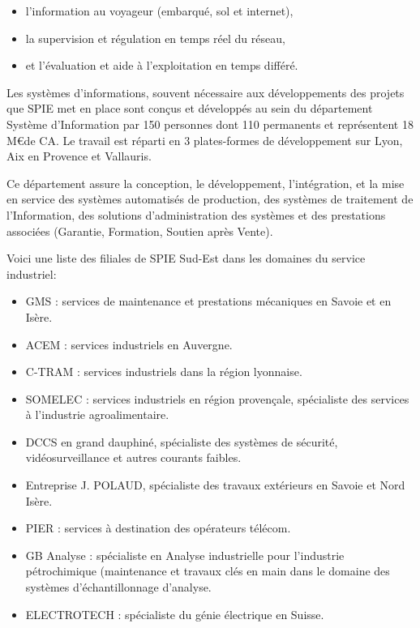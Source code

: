 \begin{itemize}
\item l’information au voyageur (embarqué, sol et internet),
\item la supervision et régulation en temps réel du réseau,
\item et l’évaluation et aide à l’exploitation en temps différé.
\end{itemize}

Les systèmes d’informations, souvent nécessaire aux développements des projets que SPIE met en place sont conçus et développés au sein du département Système d’Information par 150 personnes dont 110 permanents et représentent 18 M\euro de CA. Le travail est réparti en 3 plates-formes de développement sur Lyon, Aix en Provence et Vallauris.

Ce département assure la conception, le développement, l’intégration, et la mise en service des systèmes automatisés de production, des systèmes de traitement de l’Information, des solutions d’administration des systèmes et des prestations associées (Garantie, Formation, Soutien après Vente).\footnotemark


Voici une liste des filiales de SPIE Sud-Est dans les domaines du service industriel\footnotemark :

\begin{itemize}
\item GMS : services de maintenance et prestations mécaniques en Savoie et en Isère.
\item ACEM : services industriels en Auvergne.
\item C-TRAM : services industriels dans la région lyonnaise.
\item SOMELEC : services industriels en région provençale, spécialiste des services à l’industrie agroalimentaire.
\item DCCS en grand dauphiné, spécialiste des systèmes de sécurité, vidéosurveillance et autres courants faibles.
\item Entreprise J. POLAUD, spécialiste des travaux extérieurs en Savoie et Nord Isère.
\item PIER : services à destination des opérateurs télécom.
\item GB Analyse : spécialiste en Analyse industrielle pour l’industrie pétrochimique (maintenance et travaux clés en main dans le domaine des systèmes d’échantillonnage d’analyse.
\item ELECTROTECH : spécialiste du génie électrique en Suisse.
\end{itemize}

